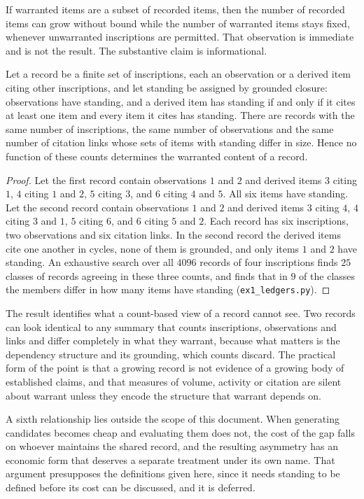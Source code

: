 If warranted items are a subset of recorded items, then the number of recorded items can grow without bound while the number of warranted items stays fixed, whenever unwarranted inscriptions are permitted. That observation is immediate and is not the result. The substantive claim is informational.

\begin{proposition}\label{prop:five}
Let a record be a finite set of inscriptions, each an observation or a derived item citing other inscriptions, and let standing be assigned by grounded closure: observations have standing, and a derived item has standing if and only if it cites at least one item and every item it cites has standing. There are records with the same number of inscriptions, the same number of observations and the same number of citation links whose sets of items with standing differ in size. Hence no function of these counts determines the warranted content of a record.
\end{proposition}

\begin{proof}
Let the first record contain observations $1$ and $2$ and derived items $3$ citing $1$, $4$ citing $1$ and $2$, $5$ citing $3$, and $6$ citing $4$ and $5$. All six items have standing. Let the second record contain observations $1$ and $2$ and derived items $3$ citing $4$, $4$ citing $3$ and $1$, $5$ citing $6$, and $6$ citing $5$ and $2$. Each record has six inscriptions, two observations and six citation links. In the second record the derived items cite one another in cycles, none of them is grounded, and only items $1$ and $2$ have standing. An exhaustive search over all $4096$ records of four inscriptions finds $25$ classes of records agreeing in these three counts, and finds that in $9$ of the classes the members differ in how many items have standing (\texttt{ex1\_ledgers.py}).
\end{proof}

The result identifies what a count-based view of a record cannot see. Two records can look identical to any summary that counts inscriptions, observations and links and differ completely in what they warrant, because what matters is the dependency structure and its grounding, which counts discard. The practical form of the point is that a growing record is not evidence of a growing body of established claims, and that measures of volume, activity or citation are silent about warrant unless they encode the structure that warrant depends on.

A sixth relationship lies outside the scope of this document. When generating candidates becomes cheap and evaluating them does not, the cost of the gap falls on whoever maintains the shared record, and the resulting asymmetry has an economic form that deserves a separate treatment under its own name. That argument presupposes the definitions given here, since it needs standing to be defined before its cost can be discussed, and it is deferred.
